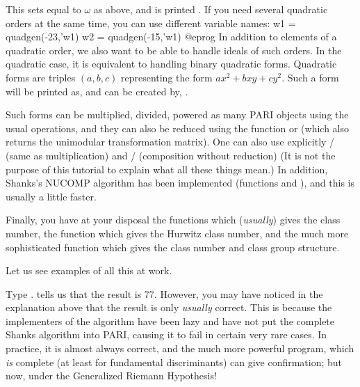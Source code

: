 This sets  equal to $\omega$ as above, and is printed .
If you need several quadratic orders at the same time, you can
use different variable names:
\bprog
  w1 = quadgen(-23,'w1)
  w2 = quadgen(-15,'w1)
@eprog\noindent
\smallskip
%
In addition to elements of a quadratic order, we also want to be able to
handle ideals of such orders. In the quadratic case, it is equivalent to
handling binary quadratic forms. Quadratic forms are triples $(a,b,c)$
representing the form $ax^2+bxy+cy^2$. Such a form will be printed as, and
can be created by, .

Such forms can be multiplied, divided, powered as many PARI objects using
the usual operations, and they can also be reduced using the function
 or  (which also returns the unimodular
transformation matrix). One can also use explicitly  /
 (same as multiplication) and  / 
(composition without reduction) (It is not the purpose of this tutorial to
explain what all these things mean.) In addition, Shanks's NUCOMP algorithm
has been implemented (functions  and ), and this
is usually a little faster.

Finally, you have at your disposal the functions  which
(\emph{usually}) gives the class number, the function 
which gives the Hurwitz class number, and the much more sophisticated
 function which gives the class number and class group
structure.

Let us see examples of all this at work.

Type .  tells us that the result is 77. However,
you may have noticed in the explanation above that the result is only
\emph{usually} correct. This is because the implementers of the algorithm
have been lazy and have not put the complete Shanks algorithm into PARI,
causing it to fail in certain very rare cases. In practice, it is almost
always correct, and the much more powerful  program, which
\emph{is} complete (at least for fundamental discriminants) can give
confirmation; but now, under the Generalized Riemann Hypothesis!

